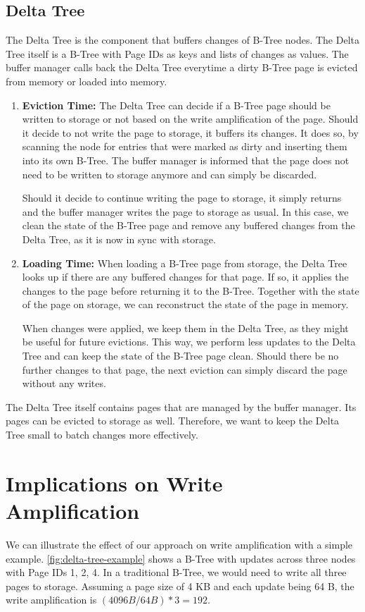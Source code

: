 \subsection*{Delta Tree}
The Delta Tree is the component that buffers changes of B-Tree nodes.
The Delta Tree itself is a B-Tree with Page IDs as keys and lists of changes as values.
The buffer manager calls back the Delta Tree everytime a dirty B-Tree page is evicted from memory or loaded into memory.

\begin{enumerate}
  \item \textbf{Eviction Time:}
The Delta Tree can decide if a B-Tree page should be written to storage or not based on the write amplification of the page.
Should it decide to not write the page to storage, it buffers its changes.
It does so, by scanning the node for entries that were marked as dirty and inserting them into its own B-Tree.
The buffer manager is informed that the page does not need to be written to storage anymore and can simply be discarded.

Should it decide to continue writing the page to storage, it simply returns and the buffer manager writes the page to storage as usual.
In this case, we clean the state of the B-Tree page and remove any buffered changes from the Delta Tree, as it is now in sync with storage.

  \item \textbf{Loading Time:}
When loading a B-Tree page from storage, the Delta Tree looks up if there are any buffered changes for that page.
If so, it applies the changes to the page before returning it to the B-Tree.
Together with the state of the page on storage, we can reconstruct the state of the page in memory.

When changes were applied, we keep them in the Delta Tree, as they might be useful for future evictions.
This way, we perform less updates to the Delta Tree and can keep the state of the B-Tree page clean.
Should there be no further changes to that page, the next eviction can simply discard the page without any writes.
\end{enumerate}

The Delta Tree itself contains pages that are managed by the buffer manager.
Its pages can be evicted to storage as well.
Therefore, we want to keep the Delta Tree small to batch changes more effectively.

\section{Implications on Write Amplification}
We can illustrate the effect of our approach on write amplification with a simple example.
\autoref{fig:delta-tree-example} shows a B-Tree with updates across three nodes with Page IDs {1, 2, 4}.
In a traditional B-Tree, we would need to write all three pages to storage.
Assuming a page size of 4 KB and each update being 64 B, the write amplification is $(4096 B / 64 B) * 3 = 192$.

